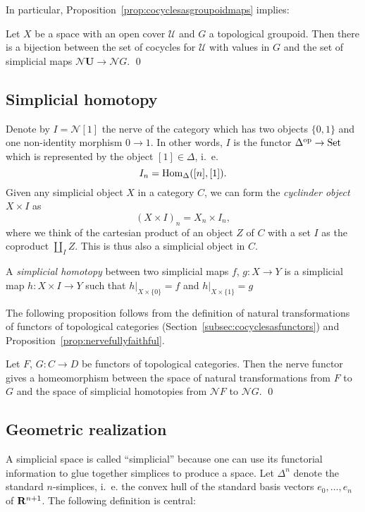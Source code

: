 \documentclass[a4paper,openany]{scrbook}
\newcommand{\nerve}{\mathcal N}
\begin{document}
In particular, Proposition~\ref{prop:cocyclesasgroupoidmaps} implies:

\begin{corollary}
Let $X$ be a space with an open cover $\mathcal U$ and $G$ a topological groupoid. Then there is a bijection between the set of cocycles for $\mathcal U$ with values in $G$ and the set of simplicial maps $\nerve \mathbf U \to \nerve G$. \qed
\end{corollary}

\subsection{Simplicial homotopy}

Denote by $I=\nerve [1]$ the nerve of the category which has two objects $\{0,1\}$ and one non-identity morphism $0 \to 1$. In other words, $I$ is the functor $\Delta^{\operatorname{op}}\to\operatorname{Set}$ which is represented by the object $[1] \in \Delta$, i.~e.
\[
I_n = \operatorname{Hom}_{\Delta}([n],[1]).
\]
Given any simplicial object $X$ in a category $C$, we can form the \emph{cyclinder object} $X \times I$ as
\[
(X \times I)_n = X_n \times I_n,
\]
where we think of the cartesian product of an object $Z$ of $C$ with a set $I$ as the coproduct $\coprod_I Z$. This is thus also a simplicial object in $C$.

\begin{defn}
A \emph{simplicial homotopy} between two simplicial maps $f$, $g\colon X \to Y$ is a simplicial map $h\colon X \times I \to Y$ such that $h|_{X \times \{0\}} = f$ and $h|_{X \times \{1\}} = g$
\end{defn}

The following proposition follows from the definition of natural transformations of functors of topological categories (Section~\ref{subsec:cocyclesasfunctors}) and Proposition~\ref{prop:nervefullyfaithful}.

\begin{prop}
Let $F$, $G\colon C \to D$ be functors of topological categories. Then the nerve functor gives a homeomorphism between the space of natural transformations from $F$ to $G$ and the space of simplicial homotopies from $\nerve F$ to $\nerve G$. \qed
\end{prop}

\subsection{Geometric realization}

A simplicial space is called “simplicial” because one can use its functorial information to glue together simplices to produce a space. Let $\Delta^n$ denote the standard $n$-simplices, i.~e. the convex hull of the standard basis vectors $e_0,\dots,e_n$ of $\mathbf R^{n+1}$. The following definition is central:
\end{document}
